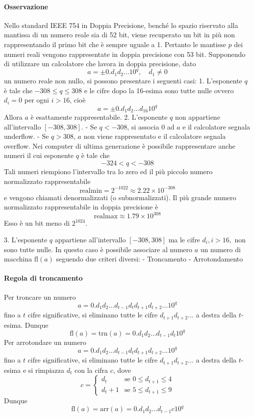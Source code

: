 \documentclass{article}
\theoremstyle{plain}
\theoremstyle{definition}
\theoremstyle{remark}
\begin{document}
\paragraph{Osservazione}
Nello standard IEEE 754 in Doppia Precisione, benché lo spazio riservato alla mantissa di un numero reale sia di 52 bit, viene recuperato un bit in più non rappresentando il primo bit che è sempre uguale a 1. Pertanto le mantisse \(p\) dei numeri reali vengono rappresentate in doppia precisione con 53 bit.
Supponendo di utilizzare un calcolatore che lavora in doppia precisione, dato
\[ a = \pm 0.d_1 d_2 \ldots 10^q, \quad d_1 \neq 0 \]
un numero reale non nullo, si possono presentare i seguenti casi:
1. L'esponente \(q\) è tale che \(-308 \leq q \leq 308\) e le cifre dopo la 16-esima sono tutte nulle ovvero \(d_i = 0\) per ogni \(i > 16\), cioè
\[ a = \pm 0.d_1 d_2 \ldots d_{16} 10^q \]
Allora \(a\) è esattamente rappresentabile.
2. L'esponente \(q\) non appartiene all'intervallo \([-308, 308]\).
   - Se \(q < -308\), si associa 0 ad \(a\) e il calcolatore segnala underflow.
   - Se \(q > 308\), \(a\) non viene rappresentato e il calcolatore segnala overflow.
Nei computer di ultima generazione è possibile rappresentare anche numeri il cui esponente \(q\) è tale che
\[ -324 < q < -308 \]
Tali numeri riempiono l'intervallo tra lo zero ed il più piccolo numero normalizzato rappresentabile
\[ \text{realmin} = 2^{-1022} \approx 2.22 \times 10^{-308} \]
e vengono chiamati denormalizzati (o subnormalizzati).
Il più grande numero normalizzato rappresentabile in doppia precisione è
\[ \text{realmax} \approx 1.79 \times 10^{308} \]
Esso è un bit meno di \(2^{1024}\).

3. L'esponente \(q\) appartiene all'intervallo \([-308, 308]\) ma le cifre \(d_i, i > 16,\) non sono tutte nulle. In questo caso è possibile associare al numero \(a\) un numero di macchina \(\text{fl}(a)\) seguendo due criteri diversi:
   - Troncamento
   - Arrotondamento

\paragraph{Regola di troncamento}
Per troncare un numero
\[ a = 0.d_1 d_2 \ldots d_{t-1} d_t d_{t+1} d_{t+2} \ldots 10^q \]
fino a \(t\) cifre significative, si eliminano tutte le cifre \(d_{t+1} d_{t+2} \ldots\) a destra della \(t\)-esima.
Dunque
\[ \text{fl}(a) = \text{trn}(a) = 0.d_1 d_2 \ldots d_{t-1} d_t 10^q \]
Per arrotondare un numero
\[ a = 0.d_1 d_2 \ldots d_{t-1} d_t d_{t+1} d_{t+2} \ldots 10^q \]
fino a \(t\) cifre significative, si eliminano tutte le cifre \(d_{t+1} d_{t+2} \ldots\) a destra della \(t\)-esima e si rimpiazza \(d_t\) con la cifra \(c\), dove
\[ c = \begin{cases} 
d_t & \text{se } 0 \leq d_{t+1} \leq 4 \\
d_t + 1 & \text{se } 5 \leq d_{t+1} \leq 9 
\end{cases} \]
Dunque
\[ \text{fl}(a) = \text{arr}(a) = 0.d_1 d_2 \ldots d_{t-1} c 10^q \]
\end{document}
